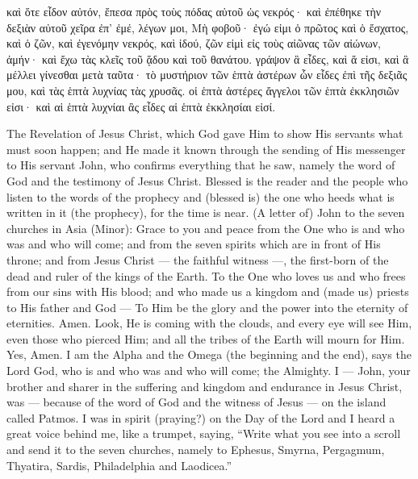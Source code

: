 \begin{pages}
\begin{Leftside}
		\pend
		\pstart
			καὶ ὅτε εἶδον αὐτόν, ἔπεσα πρὸς τοὺς πόδας αὐτοῦ ὡς νεκρός· καὶ ἐπέθηκε τὴν δεξιὰν αὐτοῦ χεῖρα ἐπ’ ἐμέ, λέγων μοι, Μὴ φοβοῦ· ἐγώ εἰμι ὁ πρῶτος καὶ ὁ ἔσχατος, καὶ ὁ ζῶν, καὶ ἐγενόμην νεκρός, καὶ ἰδού, ζῶν εἰμὶ εἰς τοὺς αἰῶνας τῶν αἰώνων, ἀμήν· καὶ ἔχω τὰς κλεῖς τοῦ ᾅδου καὶ τοῦ θανάτου. γράψον ἃ εἶδες, καὶ ἅ εἰσι, καὶ ἃ μέλλει γίνεσθαι μετὰ ταῦτα· τὸ μυστήριον τῶν ἑπτὰ ἀστέρων ὧν εἶδες ἐπὶ τῆς δεξιᾶς μου, καὶ τὰς ἑπτὰ λυχνίας τὰς χρυσᾶς. οἱ ἑπτὰ ἀστέρες ἄγγελοι τῶν ἑπτὰ ἐκκλησιῶν εἰσι· καὶ αἱ ἑπτὰ λυχνίαι ἂς εἶδες αἱ ἑπτὰ ἐκκλησίαι εἰσί.
		\pend
        \endnumbering
    \end{Leftside}
    \begin{Rightside}
        \beginnumbering
			The Revelation of Jesus Christ, which God gave Him to show His servants what must soon happen; and He made it known through the sending of His messenger to His servant John, who confirms everything that he saw, namely the word of God and the testimony of Jesus Christ. Blessed is the reader and the people who listen to the words of the prophecy and (blessed is) the one who heeds what is written in it (the prophecy), for the time is near.
		\pend
		\pstart
			(A letter of) John to the seven churches in Asia (Minor): Grace to you and peace from the One who is and who was and who will come; and from the seven spirits which are in front of His throne; and from Jesus Christ — the faithful witness —, the first-born of the dead and ruler of the kings of the Earth.
		\pend
		\pstart
			To the One who loves us and who frees from our sins with His blood; and who made us a kingdom and (made us) priests to His father and God — To Him be the glory and the power into the eternity of eternities. Amen.
		\pend
		\pstart
			Look, He is coming with the clouds, and every eye will see Him, even those who pierced Him; and all the tribes of the Earth will mourn for Him. Yes, Amen.
		\pend
		\pstart
			I am the Alpha and the Omega (the beginning and the end), says the Lord God, who is and who was and who will come; the Almighty.
		\pend
		\pstart
			I — John, your brother and sharer in the suffering and kingdom and endurance in Jesus Christ, was — because of the word of God and the witness of Jesus — on the island called Patmos. I was in spirit (praying?) on the Day of the Lord and I heard a great voice behind me, like a trumpet, saying, “Write what you see into a scroll and send it to the seven churches, namely to Ephesus, Smyrna, Pergagmum, Thyatira, Sardis, Philadelphia and Laodicea.”

\end{Rightside}
\end{pages}
